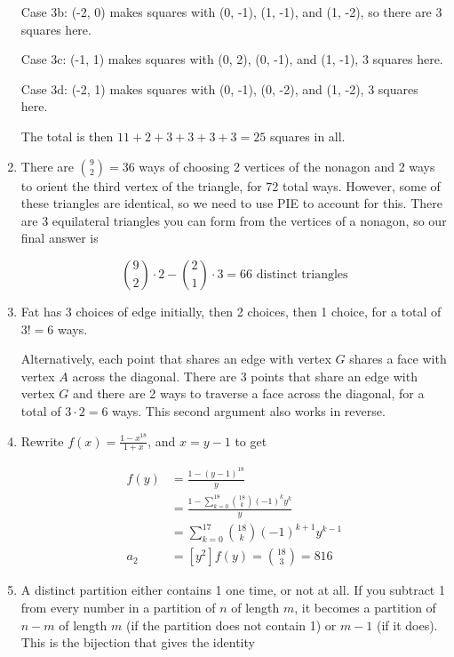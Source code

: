 \documentclass{book}
\numberwithin{equation}{section}
\begin{document}
\begin{enumerate}[label={9.\arabic*}]
Case 3b: (-2, 0) makes squares with (0, -1), (1, -1), and (1, -2), so there are 3 squares here.

Case 3c: (-1, 1) makes squares with (0, 2), (0, -1), and (1, -1), 3 squares here.

Case 3d: (-2, 1) makes squares with (0, -1), (0, -2), and (1, -2), 3 squares here.

The total is then $11 + 2 + 3 + 3 + 3 + 3 = 25$ squares in all.

\item
There are ${9 \choose 2} = 36$ ways of choosing 2 vertices of the nonagon and 2 ways to orient the third vertex
of the triangle, for 72 total ways. However, some of these triangles are identical, so we need to use PIE to account
for this. There are 3 equilateral triangles you can form from the vertices of a nonagon, so our final answer is

$${9 \choose 2} \cdot 2 - {2 \choose 1} \cdot 3 = 66 \text{ distinct triangles}$$

\item

Fat has 3 choices of edge initially, then 2 choices, then 1 choice, for a total of $3! = 6$ ways.

Alternatively, each point that shares an edge with vertex $G$ shares a face with vertex $A$ across the diagonal.
There are 3 points that share an edge with vertex $G$ and there are 2 ways to traverse a face across the diagonal,
for a total of $3 \cdot 2 = 6$ ways. This second argument also works in reverse.

\item
Rewrite $f(x) = \frac{1-x^{18}}{1+x}$, and $x = y-1$ to get

\begin{align*}
f(y) & = \frac{1-(y-1)^{18}}{y} \\
& = \frac{1 - \sum_{k=0}^{18} {18 \choose k}(-1)^ky^k}{y} \\
& = \sum_{k=0}^{17} {18 \choose k}(-1)^{k+1}y^{k-1} \\
a_2 & = [y^2]f(y) = {18 \choose 3} = 816
\end{align*}

\item
A distinct partition either contains 1 one time, or not at all. If you subtract 1 from every number in a partition of $n$
of length $m$, it becomes a partition of $n-m$ of length $m$ (if the partition does not contain 1) or $m-1$ (if it does).
This is the bijection that gives the identity


\end{enumerate}
\end{document}
